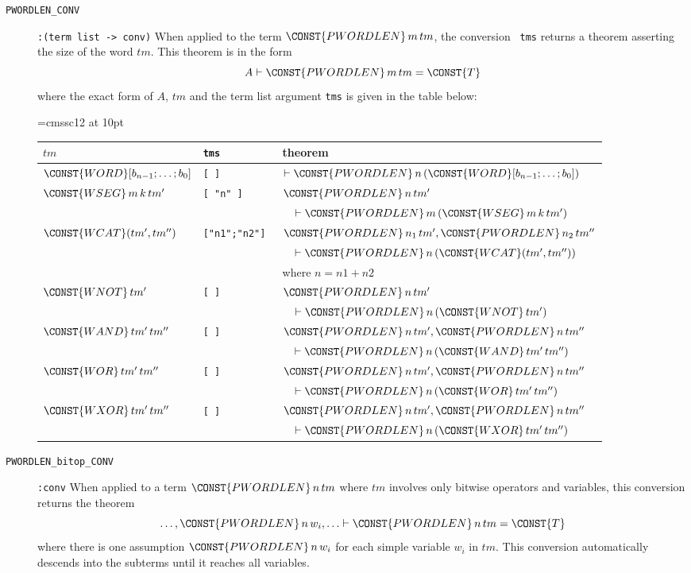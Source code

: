 \begin{description}
\item[{\tt PWORDLEN\_CONV}] \verb|:(term list -> conv)| When applied
to the term $\CONST{PWORDLEN}\,m\, tm$, the
conversion {\tt {} tms} returns a
theorem asserting the size of the word $tm$. This theorem is in the form
\[
A \THM \CONST{PWORDLEN}\,m\, tm = \CONST{T}
\]
where the exact form of $A$, $tm$ and the term list argument {\tt tms}
is given in the table below:
\begin{center}\small \font\sfc=cmssc12 at 10pt\def\constfont{\sfc}
\begin{tabular}{lll}
$tm$ & {\tt tms} & theorem\\ \hline
$\CONST{WORD}[ b_{n-1};\ldots;b_0]$ & \tt[ ] &
$\THM \CONST{PWORDLEN}\,n\, (\CONST{WORD}[ b_{n-1};\ldots;b_0])$ \\
$\CONST{WSEG}\,m\,k\,tm'$ & \tt [ "n" ] &
$\CONST{PWORDLEN}\,n\,tm'$ \\
 & & $\quad\THM \CONST{PWORDLEN}\,m\,(\CONST{WSEG}\,m\,k\,tm')$ \\
$\CONST{WCAT}(tm',tm'')$ & \tt["n1";"n2"] &
$\CONST{PWORDLEN}\,n_1\,tm',\CONST{PWORDLEN}\,n_2\,tm''$ \\
 & & $\quad\THM\CONST{PWORDLEN}\,n\,(\CONST{WCAT}(tm',tm''))$\\
 & &  where $ n = n1 + n2$ \\
$\CONST{WNOT}\,tm'$ & \tt[ ] & $\CONST{PWORDLEN}\,n\,tm'$ \\
 & & $\quad\THM\CONST{PWORDLEN}\,n\,(\CONST{WNOT}\,tm')$ \\
$\CONST{WAND}\,tm'\,tm''$ & \tt[ ] &
$\CONST{PWORDLEN}\,n\,tm',\CONST{PWORDLEN}\,n\,tm''$ \\
 & & $\quad \THM\CONST{PWORDLEN}\,n\,(\CONST{WAND}\,tm'\,tm'')$ \\
$\CONST{WOR}\,tm'\,tm''$ & \tt[ ] &
$\CONST{PWORDLEN}\,n\,tm',\CONST{PWORDLEN}\,n\,tm''$ \\
 & & $\quad\THM\CONST{PWORDLEN}\,n\,(\CONST{WOR}\,tm'\,tm'')$ \\
$\CONST{WXOR}\,tm'\,tm''$ & \tt[ ] &
$\CONST{PWORDLEN}\,n\,tm',\CONST{PWORDLEN}\,n\,tm''$ \\
 & & $\quad\THM\CONST{PWORDLEN}\,n\,(\CONST{WXOR}\,tm'\,tm'')$ \\
\end{tabular}
\end{center}

\item[{\tt PWORDLEN\_bitop\_CONV}] \verb|:conv|
When applied to a term $\CONST{PWORDLEN}\,n\,tm$ where $tm$ involves
only bitwise operators and variables, this conversion returns
the theorem
\[
\ldots,\CONST{PWORDLEN}\,n\,w_i,\ldots \THM \CONST{PWORDLEN}\,n\,tm = \CONST{T}
\]
where there is one assumption $\CONST{PWORDLEN}\,n\,w_i$ for each
simple variable $w_i$ in $tm$. This conversion automatically
descends into the subterms until it reaches all variables.


\end{description}
